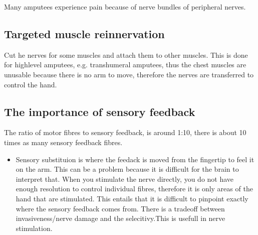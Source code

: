 \documentclass[a4paper]{article}
\begin{document}
Many amputees experience pain because of nerve bundles of peripheral nerves. 

\subsection{Targeted muscle reinnervation}
Cut he nerves for some muscles and attach them to other muscles. This is done for highlevel amputees, e.g. transhumeral amputees, thus the chest muscles are unusable because there is no arm to move, therefore the nerves are transferred to control the hand. 

\subsection{The importance of sensory feedback}
The ratio of motor fibres to sensory feedback, is around 1:10, there is about 10 times as many sensory feedback fibres. 
\begin{itemize}
	\item Sensory substituion is where the feedack is moved from the fingertip to feel it on the arm. This can be a problem because it is difficult for the brain to interpret that. When you stimulate the nerve directly, you do not have enough resolution to control individual fibres, therefore it is only areas of the hand that are stimulated. This entails that it is difficult to pinpoint exactly where the sensory feedback comes from. There is a tradeoff between invasiveness/nerve damage and the selecitivy.This is usefull in nerve stimulation.  
\end{itemize}
\end{document}
